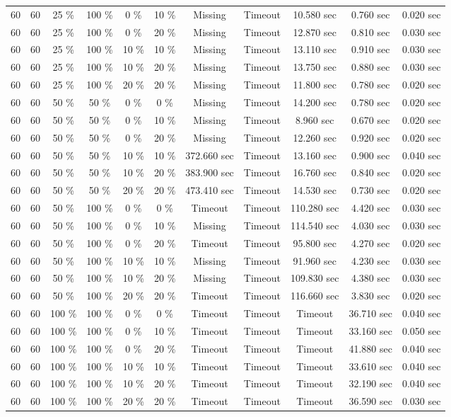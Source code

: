 \documentclass{article}
\begin{document}
\begin{longtable}[]{@{}ccccccccccc@{}}
60 & 60 & 25 \% & 100 \% & 0 \% & 10 \% & Missing & Timeout & 10.580 sec & 0.760 sec & 0.020 sec \\
60 & 60 & 25 \% & 100 \% & 0 \% & 20 \% & Missing & Timeout & 12.870 sec & 0.810 sec & 0.030 sec \\
60 & 60 & 25 \% & 100 \% & 10 \% & 10 \% & Missing & Timeout & 13.110 sec & 0.910 sec & 0.030 sec \\
60 & 60 & 25 \% & 100 \% & 10 \% & 20 \% & Missing & Timeout & 13.750 sec & 0.880 sec & 0.030 sec \\
60 & 60 & 25 \% & 100 \% & 20 \% & 20 \% & Missing & Timeout & 11.800 sec & 0.780 sec & 0.020 sec \\
60 & 60 & 50 \% & 50 \% & 0 \% & 0 \% & Missing & Timeout & 14.200 sec & 0.780 sec & 0.020 sec \\
60 & 60 & 50 \% & 50 \% & 0 \% & 10 \% & Missing & Timeout & 8.960 sec & 0.670 sec & 0.020 sec \\
60 & 60 & 50 \% & 50 \% & 0 \% & 20 \% & Missing & Timeout & 12.260 sec & 0.920 sec & 0.020 sec \\
60 & 60 & 50 \% & 50 \% & 10 \% & 10 \% & 372.660 sec & Timeout & 13.160 sec & 0.900 sec & 0.040 sec \\
60 & 60 & 50 \% & 50 \% & 10 \% & 20 \% & 383.900 sec & Timeout & 16.760 sec & 0.840 sec & 0.020 sec \\
60 & 60 & 50 \% & 50 \% & 20 \% & 20 \% & 473.410 sec & Timeout & 14.530 sec & 0.730 sec & 0.020 sec \\
60 & 60 & 50 \% & 100 \% & 0 \% & 0 \% & Timeout & Timeout & 110.280 sec & 4.420 sec & 0.030 sec \\
60 & 60 & 50 \% & 100 \% & 0 \% & 10 \% & Missing & Timeout & 114.540 sec & 4.030 sec & 0.030 sec \\
60 & 60 & 50 \% & 100 \% & 0 \% & 20 \% & Timeout & Timeout & 95.800 sec & 4.270 sec & 0.020 sec \\
60 & 60 & 50 \% & 100 \% & 10 \% & 10 \% & Missing & Timeout & 91.960 sec & 4.230 sec & 0.030 sec \\
60 & 60 & 50 \% & 100 \% & 10 \% & 20 \% & Missing & Timeout & 109.830 sec & 4.380 sec & 0.030 sec \\
60 & 60 & 50 \% & 100 \% & 20 \% & 20 \% & Timeout & Timeout & 116.660 sec & 3.830 sec & 0.020 sec \\
60 & 60 & 100 \% & 100 \% & 0 \% & 0 \% & Timeout & Timeout & Timeout & 36.710 sec & 0.040 sec \\
60 & 60 & 100 \% & 100 \% & 0 \% & 10 \% & Timeout & Timeout & Timeout & 33.160 sec & 0.050 sec \\
60 & 60 & 100 \% & 100 \% & 0 \% & 20 \% & Timeout & Timeout & Timeout & 41.880 sec & 0.040 sec \\
60 & 60 & 100 \% & 100 \% & 10 \% & 10 \% & Timeout & Timeout & Timeout & 33.610 sec & 0.040 sec \\
60 & 60 & 100 \% & 100 \% & 10 \% & 20 \% & Timeout & Timeout & Timeout & 32.190 sec & 0.040 sec \\
60 & 60 & 100 \% & 100 \% & 20 \% & 20 \% & Timeout & Timeout & Timeout & 36.590 sec & 0.030 sec \\* \bottomrule
\end{longtable}
\end{document}
